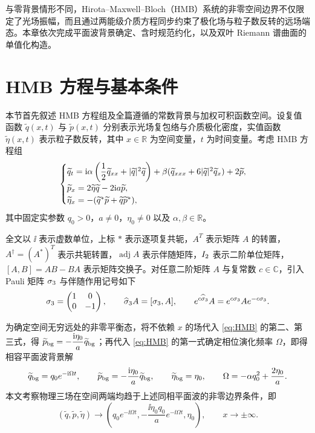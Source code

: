 
与零背景情形不同，Hirota--Maxwell--Bloch（HMB）系统的非零空间边界不仅限定了光场振幅，而且通过两能级介质方程同步约束了极化场与粒子数反转的远场端态。本章依次完成平面波背景确定、含时规范约化，以及双叶 Riemann 谱曲面的单值化构造。

\section{HMB 方程与基本条件}\label{ass:fields}

本节首先叙述 HMB 方程组及全篇遵循的常数背景与加权可积函数空间。设复值函数 $\widetilde q(x,t)$ 与 $\widetilde p(x,t)$ 分别表示光场复包络与介质极化密度，实值函数 $\widetilde\eta(x,t)$ 表示粒子数反转，其中 $x\in\mathbb R$ 为空间变量，$t$ 为时间变量。考虑 HMB 方程组\cite{PN1995}
\begin{equation}\label{eq:HMB}
\begin{cases}
\widetilde q_t=\mathrm{i}\alpha\left(\dfrac{1}{2}\widetilde q_{xx}+|\widetilde q|^2\widetilde q\right)
+\beta(\widetilde q_{xxx}+6|\widetilde q|^2\widetilde q_x)+2\widetilde p,\\
\widetilde p_x=2\widetilde\eta\widetilde q-2\mathrm{i} a\widetilde p,\\
\widetilde\eta_x=-({\widetilde q}^{*}\widetilde p+\widetilde q{\widetilde p}^{*}),
\end{cases}
\end{equation}
其中固定实参数 $q_0>0$，$a\ne0$，$\eta_0\ne0$ 以及 $\alpha,\beta\in\mathbb R$。

全文以 $\ii$ 表示虚数单位，上标 $*$ 表示逐项复共轭，$A^T$ 表示矩阵 $A$ 的转置，$A^\dagger=(A^*)^T$ 表示共轭转置，$\operatorname{adj}A$ 表示伴随矩阵，$I_2$ 表示二阶单位矩阵，$[A,B]=AB-BA$ 表示矩阵交换子。对任意二阶矩阵 $A$ 与复常数 $c\in\mathbb C$，引入 Pauli 矩阵 $\sigma_3$ 与伴随作用记号如下
\begin{equation*}
\sigma_3=\begin{pmatrix}1&0\\0&-1\end{pmatrix},\qquad
\widehat{\sigma}_3 A=[\sigma_3,A],\qquad
e^{c\widehat{\sigma}_3}A=e^{c\sigma_3}Ae^{-c\sigma_3}.
\end{equation*}

为确定空间无穷远处的非零平衡态，将不依赖 $x$ 的场代入 \eqref{eq:HMB} 的第二、第三式，得 $\widetilde p_{\rm bg}=-\dfrac{\mathrm{i}\eta_0}{a}\widetilde q_{\rm bg}$；再代入 \eqref{eq:HMB} 的第一式确定相位演化频率 $\Omega$，即得相容平面波背景解
\begin{equation}\label{eq:background}
\widetilde q_{\rm bg}=q_0e^{-\mathrm{i}\Omega t},\qquad
\widetilde p_{\rm bg}=-\dfrac{\mathrm{i}\eta_0}{a}\widetilde q_{\rm bg},\qquad
\widetilde\eta_{\rm bg}=\eta_0,\qquad
\Omega=-\alpha q_0^2+\dfrac{2\eta_0}{a}.
\end{equation}
本文考察物理三场在空间两端均趋于上述同相平面波的非零边界条件，即
\begin{equation}\label{eq:targetboundary}
(\widetilde q,\widetilde p,\widetilde\eta)\longrightarrow
\left(q_0e^{-\ii\Omega t},-\dfrac{\ii\eta_0q_0}{a}e^{-\ii\Omega t},\eta_0\right),\qquad x\longrightarrow\pm\infty.
\end{equation}

